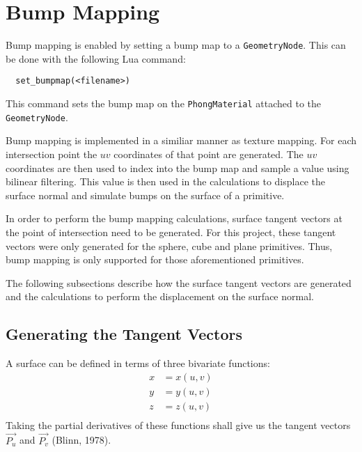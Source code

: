 \section{Bump Mapping}

Bump mapping is enabled by setting a bump map to a \verb|GeometryNode|. This can
be done with the following Lua command:
\begin{lstlisting}
  set_bumpmap(<filename>)
\end{lstlisting}
This command sets the bump map on the \verb|PhongMaterial| attached to the
\verb|GeometryNode|.

Bump mapping is implemented in a similiar manner as texture mapping. For each
intersection point the $uv$ coordinates of that point are generated. The $uv$
coordinates are then used to index into the bump map and sample a value
using bilinear filtering. This value is then used in the calculations to
displace the surface normal and simulate bumps on the surface of a primitive.

In order to perform the bump mapping calculations, surface tangent vectors at
the point of intersection need to be generated. For this project, these tangent
vectors were only generated for the sphere, cube and plane primitives. Thus,
bump mapping is only supported for those aforementioned primitives.

The following subsections describe how the surface tangent vectors are generated
and the calculations to perform the displacement on the surface normal.

\subsection{Generating the Tangent Vectors}
A surface can be defined in terms of three bivariate functions:
\begin{equation}
\begin{split}
  x &= x(u, v) \\
  y &= y(u, v) \\
  z &= z(u, v) \\
\end{split}
\end{equation}
Taking the partial derivatives of these functions shall give us the tangent
vectors $\vec{P_{u}}$ and $\vec{P_{v}}$ (Blinn, 1978).


